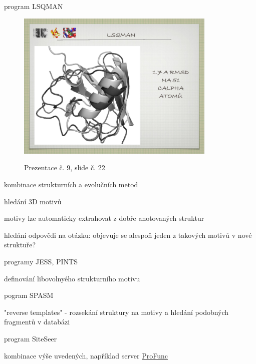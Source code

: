 \documentclass[DIV=8]{scrreprt}
\begin{document}
\begin{myItemize}[nosep]
\begin{myItemize}[nosep]
    \item program LSQMAN \begin{figure}
    \caption{Prezentace č. 9, slide č. 22}
    \includegraphics[width=0.85\textwidth]{slides-9/slide-22.jpg}
    \centering
    \label{slides-9-slide-22}
\end{figure}

\end{myItemize}

    \item kombinace strukturních a evolučních metod
    \item hledání 3D motivů
\begin{myItemize}[nosep]
    \item motivy lze automaticky extrahovat z dobře anotovaných struktur
    \item hledání odpovědi na otázku: objevuje se alespoň jeden z takových motivů v nové struktuře?
\begin{myItemize}[nosep]
    \item programy JESS, PINTS
\end{myItemize}

    \item definování libovolnyého strukturního motivu
\begin{myItemize}[nosep]
    \item pogram SPASM
\end{myItemize}

    \item "reverse templates" - rozsekání struktury na motivy a hledání podobných fragmentů v databázi
\begin{myItemize}[nosep]
    \item program SiteSeer
\end{myItemize}

\end{myItemize}

    \item kombinace výše uvedených, například server \href{http://www.ebi.ac.uk/thornton-srv/databases/ProFunc/}{ProFunc}
\end{myItemize}
\end{document}

